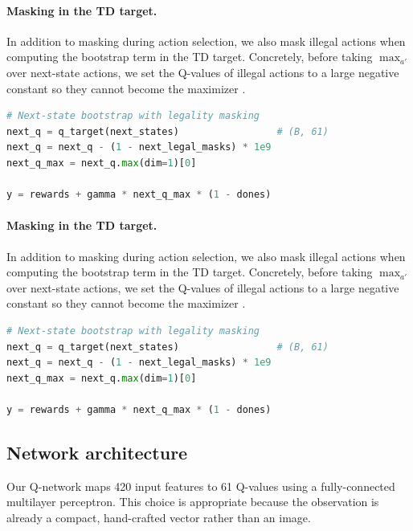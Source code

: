 \documentclass[11pt]{article}
\begin{document}
\paragraph{Masking in the TD target.}
In addition to masking during action selection, we also mask illegal actions when computing the bootstrap term in the TD target. Concretely, before taking $\max_{a'}$ over next-state actions, we set the Q-values of illegal actions to a large negative constant so they cannot become the maximizer \parencite{policyuno_repo}.

\begin{lstlisting}[language=Python]
# Next-state bootstrap with legality masking
next_q = q_target(next_states)                 # (B, 61)
next_q = next_q - (1 - next_legal_masks) * 1e9
next_q_max = next_q.max(dim=1)[0]

y = rewards + gamma * next_q_max * (1 - dones)
\end{lstlisting}

\paragraph{Masking in the TD target.}
In addition to masking during action selection, we also mask illegal actions when computing the bootstrap term in the TD target. Concretely, before taking $\max_{a'}$ over next-state actions, we set the Q-values of illegal actions to a large negative constant so they cannot become the maximizer \parencite{policyuno_repo}.

\begin{lstlisting}[language=Python]
# Next-state bootstrap with legality masking
next_q = q_target(next_states)                 # (B, 61)
next_q = next_q - (1 - next_legal_masks) * 1e9
next_q_max = next_q.max(dim=1)[0]

y = rewards + gamma * next_q_max * (1 - dones)
\end{lstlisting}

\subsection{Network architecture}
Our Q-network maps 420 input features to 61 Q-values using a fully-connected multilayer perceptron. This choice is appropriate because the observation is already a compact, hand-crafted vector rather than an image.

\begin{center}
\end{center}
\end{document}
